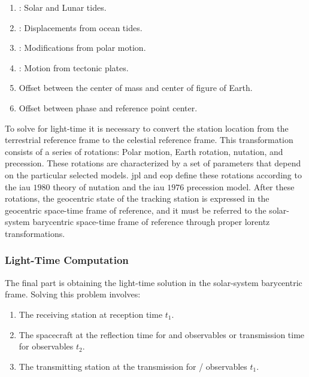 \documentclass{article}
\theoremstyle{mystyle}
\begin{document}
\begin{enumerate}[itemsep=0pt]
\item {}: Solar and Lunar tides.
\item {}: Displacements from ocean tides.
\item {}: Modifications from polar motion.
\item {}: Motion from tectonic plates.
\item Offset between the center of mass and center of figure of Earth.
\item Offset between phase and reference point center.
\end{enumerate}

\noindent To solve for light-time it is necessary to convert the station location from the terrestrial reference frame to the celestial reference frame. This transformation consists of a series of rotations: Polar motion, Earth rotation, \gls{nutation}, and \gls{precession}. These rotations are characterized by a set of parameters that depend on the particular selected models. \gls{jpl} and \gls{eop} define these rotations according to the \gls{iau} $1980$ theory of \gls{nutation} and the \gls{iau} $1976$ \gls{precession} model. After these rotations, the geocentric state of the tracking
station is expressed in the geocentric space-time frame of reference, and it must be referred to the solar-system barycentric space-time frame of reference through proper
\glspl{lorentz transformation}.

\subsubsection{\footnotesize Light-Time Computation}

The final part is obtaining the light-time solution in the solar-system barycentric frame. Solving this problem involves:

\begin{enumerate}[itemsep=0pt]
    \item The receiving station at reception time $t_1$.
    \item The spacecraft at the reflection time for  and  observables or transmission time for  observables $t_2$.
    \item The transmitting station at the transmission for / observables $t_1$.
\end{enumerate}
\end{document}
